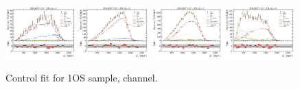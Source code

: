 \begin{figure}[htb]
    \includegraphics[width=0.24\textwidth]{./figs-fit-fit-results/ctrl-fit/lines_q2_slices/fit_result-lines_q2_idx1-Dst-1os-el.pdf}
    \includegraphics[width=0.24\textwidth]{./figs-fit-fit-results/ctrl-fit/lines_q2_slices/fit_result-lines_q2_idx2-Dst-1os-el.pdf}
    \includegraphics[width=0.24\textwidth]{./figs-fit-fit-results/ctrl-fit/lines_q2_slices/fit_result-lines_q2_idx3-Dst-1os-el.pdf}
    \includegraphics[width=0.24\textwidth]{./figs-fit-fit-results/ctrl-fit/lines_q2_slices/fit_result-lines_q2_idx4-Dst-1os-el.pdf}

    \caption{Control fit for 1OS sample, \Dstar channel.}
    \label{fig:ctrl-1os-dst}
\end{figure}

